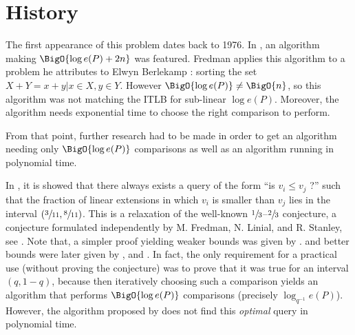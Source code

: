 

\section{History}


The first appearance of this problem dates back to 1976. In \cite{fredman1976good}, an algorithm making $\BigO{\log e(P) + 2n}$ was featured. Fredman applies this algorithm to a problem he attributes to Elwyn Berlekamp : sorting the set $X + Y = {x + y | x \in X, y \in Y}$. However $\BigO{\log e(P)} \neq \BigO{n}$, so this algorithm was not matching the ITLB for sub-linear $\log e(P)$. Moreover, the algorithm needs exponential time to choose the right comparison to perform.


From that point, further research had to be made in order to get an algorithm needing only $\BigO{\log e(P)}$ comparisons as well as an algorithm running in polynomial time.


In \cite{kahn1984balancing}, it is showed that there always exists a query of the form ``is $v_i \leq v_j$ ?'' such that the fraction of linear extensions in which $v_i$ is smaller than $v_j$ lies in the interval $(\sfrac{3}{11}, \sfrac{8}{11})$. This is a relaxation of the well-known $\sfrac{1}{3}$--$\sfrac{2}{3}$ conjecture, a conjecture formulated independently by M. Fredman, N. Linial, and R. Stanley, see \cite{linial1984information}. Note that, a simpler proof yielding weaker bounds was given by \cite{kahn1991balancing}. and better bounds were later given by \cite{brightwell1995balancing}, and \cite{brightwell1999balanced}. In fact, the only requirement for a practical use (without proving the conjecture) was to prove that it was true for an interval $(q, 1-q)$, because then iteratively choosing such a comparison yields an algorithm that performs $\BigO{\log e(P)}$ comparisons (precisely $\log_{q^{-1}} e(P)$). However, the algorithm proposed by \cite{kahn1984balancing} does not find this \emph{optimal} query in polynomial time.

